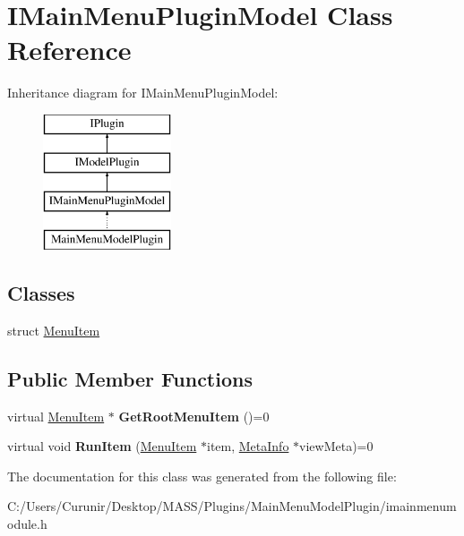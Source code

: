 \hypertarget{class_i_main_menu_plugin_model}{}\section{I\+Main\+Menu\+Plugin\+Model Class Reference}
\label{class_i_main_menu_plugin_model}
Inheritance diagram for I\+Main\+Menu\+Plugin\+Model\+:\begin{figure}[H]
\begin{center}
\leavevmode
\includegraphics[height=4.000000cm]{class_i_main_menu_plugin_model}
\end{center}
\end{figure}
\subsection*{Classes}
\begin{DoxyCompactItemize}
\item 
struct \hyperlink{struct_i_main_menu_plugin_model_1_1_menu_item}{Menu\+Item}
\end{DoxyCompactItemize}
\subsection*{Public Member Functions}
\begin{DoxyCompactItemize}
\item 
\mbox{\label{class_i_main_menu_plugin_model_a61477b16187bfdc4ef7c3ccd72d2c09d}} 
virtual \hyperlink{struct_i_main_menu_plugin_model_1_1_menu_item}{Menu\+Item} $\ast$ {\bfseries Get\+Root\+Menu\+Item} ()=0
\item 
\mbox{\label{class_i_main_menu_plugin_model_a45021f95c0dc5e75e938848d32053f92}} 
virtual void {\bfseries Run\+Item} (\hyperlink{struct_i_main_menu_plugin_model_1_1_menu_item}{Menu\+Item} $\ast$item, \hyperlink{struct_meta_info}{Meta\+Info} $\ast$view\+Meta)=0
\end{DoxyCompactItemize}


The documentation for this class was generated from the following file\+:\begin{DoxyCompactItemize}
\item 
C\+:/\+Users/\+Curunir/\+Desktop/\+M\+A\+S\+S/\+Plugins/\+Main\+Menu\+Model\+Plugin/imainmenumodule.\+h\end{DoxyCompactItemize}
